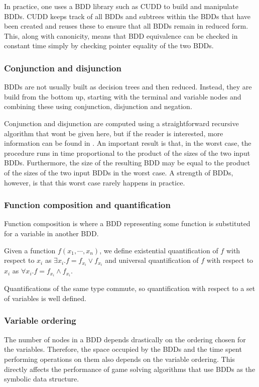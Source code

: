 \documentclass{book}
\theoremstyle{definition}
\begin{document}
In practice, one uses a BDD library such as CUDD \cite{cudd} to build and manipulate BDDs. CUDD keeps track of all BDDs and subtrees within the BDDs that have been created and reuses these to ensure that all BDDs remain in reduced form. This, along with canonicity, means that BDD equivalence can be checked in constant time simply by checking pointer equality of the two BDDs.

\subsubsection{Conjunction and disjunction}

BDDs are not usually built as decision trees and then reduced. Instead, they are build from the bottom up, starting with the terminal and variable nodes and combining these using conjunction, disjunction and negation.

Conjunction and disjunction are computed using a straightforward recursive algorithm that wont be given here, but if the reader is interested, more information can be found in \cite{somenzi_bdd}. An important result is that, in the worst case, the procedure runs in time proportional to the product of the sizes of the two input BDDs. Furthermore, the size of the resulting BDD may be equal to the product of the sizes of the two input BDDs in the worst case. A strength of BDDs, however, is that this worst case rarely happens in practice. 

\subsubsection{Function composition and quantification}

Function composition is where a BDD representing some function is substituted for a variable in another BDD.

Given a function $f(x_1,\cdots,x_n)$, we define existential quantification of $f$ with respect to $x_i$ as $\exists x_i. f = f_{x_i} \vee f_{x_i}$ and universal quantification of $f$ with respect to $x_i$ as $\forall x_i. f = f_{x_i} \wedge f_{x_i}$.

Quantifications of the same type commute, so quantification with respect to a set of variables is well defined. 

\subsubsection{Variable ordering}

The number of nodes in a BDD depends drastically on the ordering chosen for the variables. Therefore, the space occupied by the BDDs and the time spent performing operations on them also depends on the variable ordering. This directly affects the performance of game solving algorithms that use BDDs as the symbolic data structure. 
\end{document}
